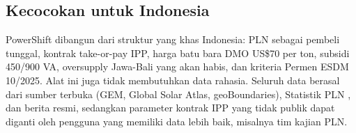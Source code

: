 \subsection{Kecocokan untuk Indonesia}

PowerShift dibangun dari struktur yang khas Indonesia: PLN sebagai pembeli tunggal, kontrak take-or-pay IPP, harga batu bara DMO US\$70 per ton, subsidi 450/900 VA, oversupply Jawa-Bali yang akan habis, dan kriteria Permen ESDM 10/2025. Alat ini juga tidak membutuhkan data rahasia. Seluruh data berasal dari sumber terbuka (GEM, Global Solar Atlas, geoBoundaries), Statistik PLN \parencite{D-PLN-STAT-2025}, dan berita resmi, sedangkan parameter kontrak IPP yang tidak publik dapat diganti oleh pengguna yang memiliki data lebih baik, misalnya tim kajian PLN.
